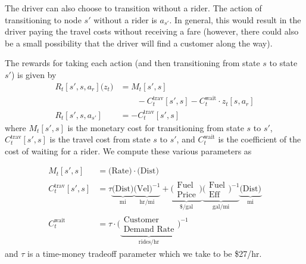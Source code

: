 The driver can also choose to transition without a rider. The action of transitioning to node $s'$ without a rider is $a_{s'}$.  In general, this would result in the driver paying the travel costs without receiving a fare (however, there could also be a small possibility that the driver will find a customer along the way).


The rewards for taking each action (and then transitioning from state $s$ to state $s'$) is given by
\begin{align}
R_t[s',s,a_r]\Big(z_t\Big) & = M_t[s',s] \\
& \qquad - C_t^\text{trav}[s',s] - C^\text{wait}_t \cdot z_t[s,a_r] \\
R_t[s',s,a_{s'}] & = - C_t^\text{trav}[s',s]
\end{align}
where $M_t[s',s]$ is the monetary cost for transitioning from state $s$ to $s'$, $C_t^\text{trav}[s',s]$ is the travel cost from state $s$ to $s'$, and $C_t^\text{wait}$ is the coefficient of the cost of waiting for a rider.  We compute these various parameters as

\begin{align}
M_t[s',s] & = \big(\text{Rate}\big) \cdot \big(\text{Dist}\big) \\
C_t^\text{trav}[s',s] & = 
\tau 
\underbrace{\big(\text{Dist}\big)}_{\text{mi}}
\underbrace{\big(\text{Vel}\big)^{-1}}_{\text{hr}/\text{mi}} + 
\underbrace{\big(\substack{\text{Fuel} \\ \text{Price} } \big)}_{\$/\text{gal}}
\underbrace{\big( \substack{\text{Fuel} \\ \text{Eff}} \big)^{-1}}_{\text{gal}/\text{mi}} 
\underbrace{\big(\text{Dist}\big)}_{\text{mi}}
\label{eq:travel} \\
C^\text{wait}_t & = \tau \cdot 
\Big(%
\underbrace{
\substack{\text{Customer} \\ \text{Demand Rate} }%
}_{\text{rides}/\text{hr}}
\Big)^{-1}
\end{align}
and $\tau$ is a time-money tradeoff parameter which we take to be \$27/hr.  

